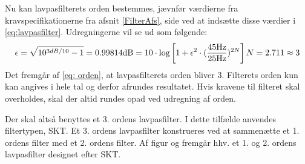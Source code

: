 Nu kan lavpasfilterets orden bestemmes, jævnfør værdierne fra kravspecifikationerne fra afsnit \ref{FilterAfs}, side \pageref{FilterAfs} ved at indsætte disse værdier i \eqref{eq:lavpasfilter}. Udregningerne vil se ud som følgende:
\begin{equation}
\epsilon = \sqrt{10^{3dB /10} -1} = 0.998 \\ \label{eq:orden}
14\text{dB} = 10 \cdot \text{log} \left[1 + \epsilon ^2 \cdot (\frac{45\text{Hz}}{25\text{Hz}})^{2N}\right] \\
N = 2.711 \approx 3
\end{equation}
\noindent Det fremgår af \eqref{eq: orden}, at lavpasfilterets orden bliver $3$. Filterets orden kun kan angives i hele tal og derfor afrundes resultatet. Hvis kravene til filteret skal overholdes, skal der altid rundes opad ved udregning af orden.

Der skal altså benyttes et 3. ordens lavpasfilter. I dette tilfælde anvendes filtertypen, SKT. Et 3. ordens lavpasfilter konstrueres ved at sammenætte et 1. ordens filter med et 2. ordens filter. Af figur  og  fremgår hhv. et 1. og 2. ordens lavpasfilter designet efter SKT. \cite{Carter2013}
	
